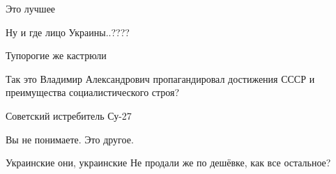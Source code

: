 \begin{itemize}
\begin{itemize}
\end{itemize}

 
Это лучшее

 
Ну и где лицо Украины..????

 
Тупорогие же кастрюли

 
Так это Владимир Александрович пропагандировал достижения СССР и преимущества социалистического строя?

 
Советский истребитель Су-27

 
Вы не понимаете. Это другое.

 
Украинские они, украинские
Не продали же по дешёвке, как все остальное?


\end{itemize}
